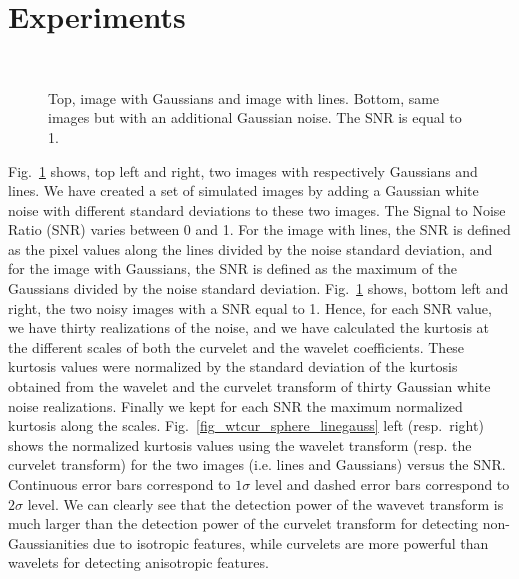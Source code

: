 \section{Experiments}
\begin{figure}[htb]
\centerline{
\vbox{
\hbox{
}
\hbox{
}}
}
\caption{Top, image with Gaussians and image with lines. Bottom, same images but with an additional Gaussian noise. The SNR is equal to 1.}
\label{fig_sphere_linegauss}
\end{figure}
Fig.~\ref{fig_sphere_linegauss} shows, top left and right, two images with respectively Gaussians and lines. We have created a set 
of simulated images by adding a Gaussian white noise with different standard deviations to these two images. The Signal to Noise 
Ratio (SNR) varies between 0 and 1. For the image with lines, the SNR is defined as the pixel values along the lines divided by the 
noise standard deviation, and  for the image with Gaussians, the SNR is defined as the maximum of the Gaussians divided by the noise 
standard deviation. Fig.~\ref{fig_sphere_linegauss} shows, bottom left and right, the two noisy images with a SNR equal to 1. Hence, 
for each SNR value, we have thirty realizations of the noise, and we have calculated the kurtosis at the different scales of both the 
curvelet and the wavelet coefficients. These kurtosis values were normalized by the standard deviation of the kurtosis obtained from 
the wavelet and the curvelet transform of thirty Gaussian white noise realizations. Finally we kept for each SNR the maximum normalized 
kurtosis along the scales. Fig.~\ref{fig_wtcur_sphere_linegauss} left (resp.~right) shows the normalized kurtosis values using the wavelet 
transform (resp. the curvelet transform) for the two images (i.e. lines and Gaussians) versus the SNR. Continuous error bars correspond 
to $1\sigma$ level and dashed error bars correspond to $2\sigma$ level. We can clearly see that the detection power of the wavevet 
transform is much larger than the detection power of the curvelet transform for detecting non-Gaussianities due to isotropic features, 
while curvelets are more powerful than wavelets for detecting anisotropic features.

